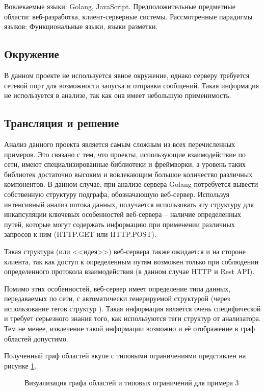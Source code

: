 Вовлекаемые языки: Golang, JavaScript. Предположительные предметные области: веб-разработка, клиент-серверные системы.
Рассмотренные парадигмы языков: Функциональные языки, языки разметки.

\subsection{Окружение}

В данном проекте не используется явное окружение, однако серверу требуется сетевой порт для возможности
запуска и отправки сообщений. Такая информация не используется в анализе, так как она имеет небольшую применимость.

\subsection{Трансляция и решение}

Анализ данного проекта является самым сложным из всех перечисленных примеров. Это связано с тем, что
проекты, использующие взаимодействие по сети, имеют специализированные библиотеки и фреймворки, а
уровень таких библиотек достаточно высоким и вовлекающим большое количество различных компонентов.
В данном случае, при анализе сервера Golang потребуется вывести собственную структуру подграфа, обозначающую
веб-сервер. Используя интенсивный анализ потока данных, получается использовать эту структуру
для инкапсуляции ключевых особенностей веб-сервера -- наличие определенных путей, которые
могут содержать информацию при применении различных запросов к ним (HTTP.GET или HTTP.POST).

Такая структура (или <<идея>>) веб-сервера также ожидается и на стороне клиента, так как
доступ к определенным путям возможен только при соблюдении определенного протокола взаимодействия (в данном случае HTTP и Rest API).

Помимо этих особенностей, веб-сервер имеет определение типа данных, передаваемых по сети, с автоматически генерируемой
структурой (через использование тегов структур \cite{struct-tags}). Такая информация является очень специфической и требует
серьезного знания того, как используются теги структур от анализатора. Тем не менее, извлечение такой информации
возможно и её отображение в граф областей допустимо.

Полученный граф областей вкупе с типовыми ограничениями представлен на рисунке \ref{fig:example_3}.
\begin{figure}[H]
    \centering
    \caption{Визуализация графа областей и типовых ограничений для примера 3}
    \label{fig:example_3}
\end{figure}

